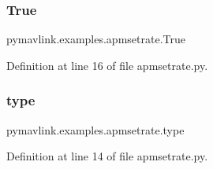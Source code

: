 \subsubsection{\texorpdfstring{True}{True}}
{\footnotesize\ttfamily pymavlink.\+examples.\+apmsetrate.\+True}



Definition at line 16 of file apmsetrate.\+py.

\mbox{\label{namespacepymavlink_1_1examples_1_1apmsetrate_a6ddec302ac765bf4507deaeac82a9742}} 
\subsubsection{\texorpdfstring{type}{type}}
{\footnotesize\ttfamily pymavlink.\+examples.\+apmsetrate.\+type}



Definition at line 14 of file apmsetrate.\+py.

